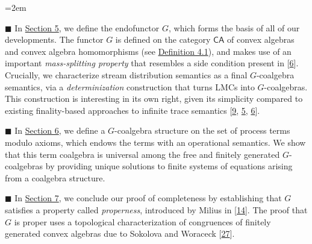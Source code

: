 \begin{list}{}{\leftmargin=2em}
\hypertarget{html:S1.I1.i4}{}
\item[]  %
\hypertarget{html:S1.I1.i4.m1}{}\({\blacksquare}\) %
\hypertarget{html:S1.I1.i4.p1}{} In \hyperlink{html:S5}{Section 5}, we define the endofunctor %
\hypertarget{html:S1.I1.i4.p1.m1}{}\({G}\), which forms the basis of all of our developments. The functor %
\hypertarget{html:S1.I1.i4.p1.m2}{}\({G}\) is defined on the category %
\hypertarget{html:S1.I1.i4.p1.m3}{}\({\mathsf{CA}}\) of convex algebras and convex algebra homomorphisms (see \hyperlink{html:S4.Thmtheorem1}{Definition 4.1}), and makes use of an important \emph{mass-splitting property} that resembles a side condition present in [\hyperlink{html:bib.bib6}{6}]. Crucially, we characterize stream distribution semantics as a final %
\hypertarget{html:S1.I1.i4.p1.m4}{}\({G}\)-coalgebra semantics, via a \emph{determinization} construction that turns LMCs into %
\hypertarget{html:S1.I1.i4.p1.m5}{}\({G}\)-coalgebras. This construction is interesting in its own right, given its simplicity compared to existing finality-based approaches to infinite trace semantics [\hyperlink{html:bib.bib9}{9}, \hyperlink{html:bib.bib5}{5}, \hyperlink{html:bib.bib6}{6}].
\par\medskip
  
\hypertarget{html:S1.I1.i5}{}
\item[]  %
\hypertarget{html:S1.I1.i5.m1}{}\({\blacksquare}\) %
\hypertarget{html:S1.I1.i5.p1}{} In \hyperlink{html:S6}{Section 6}, we define a %
\hypertarget{html:S1.I1.i5.p1.m1}{}\({G}\)-coalgebra structure on the set of process terms modulo axioms, which endows the terms with an operational semantics. We show that this term coalgebra is universal among the free and finitely generated %
\hypertarget{html:S1.I1.i5.p1.m2}{}\({G}\)-coalgebras by providing unique solutions to finite systems of equations arising from a coalgebra structure.
\par\medskip
  
\hypertarget{html:S1.I1.i6}{}
\item[]  %
\hypertarget{html:S1.I1.i6.m1}{}\({\blacksquare}\) %
\hypertarget{html:S1.I1.i6.p1}{} In \hyperlink{html:S7}{Section 7}, we conclude our proof of completeness by establishing that %
\hypertarget{html:S1.I1.i6.p1.m1}{}\({G}\) satisfies a property called \emph{properness}, introduced by Milius in [\hyperlink{html:bib.bib14}{14}]. The proof that %
\hypertarget{html:S1.I1.i6.p1.m2}{}\({G}\) is proper uses a topological characterization of congruences of finitely generated convex algebras due to Sokolova and Woraceck [\hyperlink{html:bib.bib27}{27}].
\par\medskip
  

\end{list}
